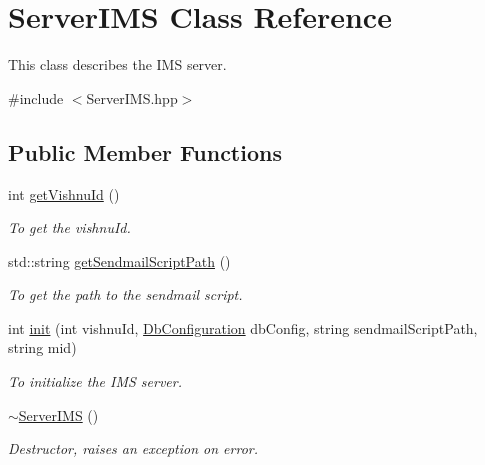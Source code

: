 \hypertarget{classServerIMS}{
\section{ServerIMS Class Reference}
\label{classServerIMS}
}


This class describes the IMS server.  




{\ttfamily \#include $<$ServerIMS.hpp$>$}

\subsection*{Public Member Functions}
\begin{DoxyCompactItemize}
\item 
int \hyperlink{classServerIMS_a2f726a8bf59e70e472a400a69dcf9e48}{getVishnuId} ()
\begin{DoxyCompactList}\small\item\em To get the vishnuId. \item\end{DoxyCompactList}\item 
std::string \hyperlink{classServerIMS_aeb4b4c373ac661c32b839b6c066b442d}{getSendmailScriptPath} ()
\begin{DoxyCompactList}\small\item\em To get the path to the sendmail script. \item\end{DoxyCompactList}\item 
int \hyperlink{classServerIMS_a81304b0173c5fca9ab9da6112d4b07f5}{init} (int vishnuId, \hyperlink{classDbConfiguration}{DbConfiguration} dbConfig, string sendmailScriptPath, string mid)
\begin{DoxyCompactList}\small\item\em To initialize the IMS server. \item\end{DoxyCompactList}\item 
\hypertarget{classServerIMS_aeb2278dc02218409339e61da443d343a}{
\hyperlink{classServerIMS_aeb2278dc02218409339e61da443d343a}{$\sim$ServerIMS} ()}
\label{classServerIMS_aeb2278dc02218409339e61da443d343a}

\begin{DoxyCompactList}\small\item\em Destructor, raises an exception on error. \item\end{DoxyCompactList}\end{DoxyCompactItemize}
